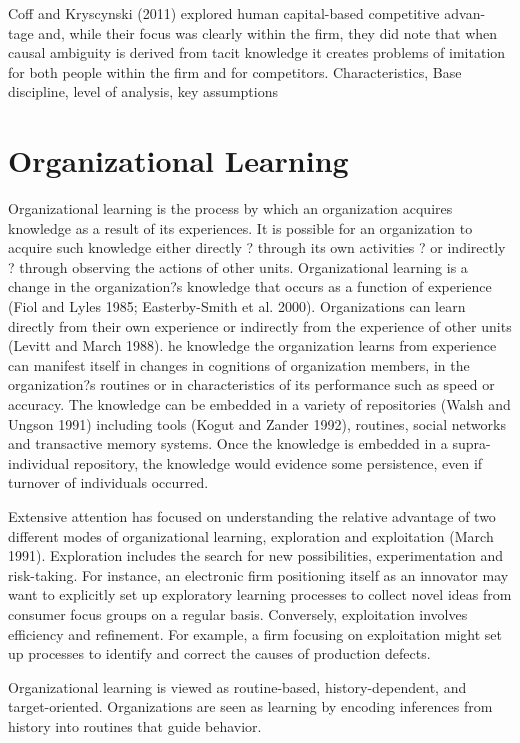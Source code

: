 \documentclass[12pt,letterpaper]{article}
\begin{document}
Coff and Kryscynski (2011) explored human capital-based competitive advan- tage and, while their focus was clearly within the firm, they did note that when causal ambiguity is derived from tacit knowledge it creates problems of imitation for both people within the firm and for competitors.
Characteristics, Base discipline, level of analysis, key assumptions

\section{Organizational Learning}
Organizational learning is the process
by which an organization acquires knowledge as a
result of its experiences. It is possible for an organization
to acquire such knowledge either
directly ? through its own activities ? or
indirectly ? through observing the actions of
other units.
Organizational learning is a change in the organization?s
knowledge that occurs as a function of
experience (Fiol and Lyles 1985; Easterby-Smith
et al. 2000). Organizations can learn directly from
their own experience or indirectly from the experience
of other units (Levitt and March 1988).
he knowledge the organization
learns from experience can manifest itself in
changes in cognitions of organization members,
in the organization?s routines or in characteristics
of its performance such as speed or accuracy. The knowledge
can be embedded in a variety of repositories
(Walsh and Ungson 1991) including tools
(Kogut and Zander 1992), routines, social networks
and transactive memory systems. Once
the knowledge is embedded in a supra-individual
repository, the knowledge would evidence some
persistence, even if turnover of individuals
occurred.

Extensive attention has focused on understanding
the relative advantage of two different modes of
organizational learning, exploration and exploitation
(March 1991). Exploration includes the
search for new possibilities, experimentation and
risk-taking. For instance, an electronic firm positioning
itself as an innovator may want to explicitly
set up exploratory learning processes to
collect novel ideas from consumer focus groups
on a regular basis. Conversely, exploitation
involves efficiency and refinement. For example,
a firm focusing on exploitation might set up processes
to identify and correct the causes of production
defects.

Organizational learning is viewed as routine-based, history-dependent, and target-oriented. Organizations are seen as learning by encoding inferences from history into routines that guide behavior.
\end{document}
